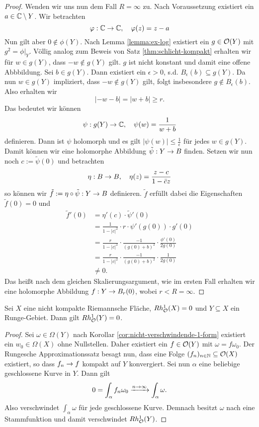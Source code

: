 \begin{proof}
  Wenden wir uns nun dem Fall $R = \infty$ zu. Nach Voraussetzung
  existiert ein $a \in \mathbb{C} \setminus Y$. Wir betrachten
  \[
  \varphi: \mathbb{C} \rightarrow \mathbb{C}, \quad \varphi(z) = z -a
  \]
  Nun gilt aber $0 \notin \phi(Y)$. Nach Lemma \ref{lemma:ex-log}
  existiert ein $g \in \mathcal{O}(Y)$ mit $g^2 = \phi|_Y$. Völlig analog
  zum Beweis von Satz \ref{thm:schlicht-kompakt} erhalten wir für $w
  \in g(Y)$, dass $-w \notin g(Y)$ gilt. $g$ ist nicht konstant und damit
  eine offene Abbbildung. Sei $b \in g(Y)$. Dann existiert ein
  $\epsilon > 0$, s.d. $B_{\epsilon}(b) \subseteq g(Y)$. Da nun  $w
  \in g(Y)$ impliziert, dass $-w \notin g(Y)$ gilt, folgt insbesondere $g \notin
  B_\epsilon(b)$. Also erhalten wir
  \[
  |-w - b| = |w + b| \geq r.
  \]
  Das bedeutet wir können
  \[
  \psi: g(Y) \rightarrow \mathbb{C}, \quad \psi(w) = \frac{1}{w+b}
  \]
  definieren. Dann ist $\psi$ holomorph und es gilt $|\psi(w)| \leq
  \frac{1}{\epsilon}$ für jedes $w \in g(Y)$. 
  Damit können wir eine holomorphe Abbildung $\tilde \psi: Y \rightarrow B$
  finden. Setzen wir nun noch $c:= \tilde \psi(0)$ und betrachten
  \[
  \eta: B \rightarrow B, \quad \eta(z) = \frac{z-c}{1-\bar c z}
  \]
  so können wir $\tilde f := \eta \circ \tilde \psi: Y \rightarrow B$
  definieren. $\tilde f$ erfüllt dabei die Eigenschaften $\tilde f(0)
  = 0$ und
  \begin{align*}
    \tilde f'(0) & = \eta'(c) \cdot \tilde \psi'(0) \\
    & = \frac{1}{1- |c|^2} \cdot r \cdot \psi'(g(0)) \cdot g'(0) \\
    & = \frac{r}{1 - |c|^2} \cdot \frac{-1}{(g(0) + b)^2} \cdot
    \frac{\phi'(0)}{2 g(0)} \\
    & = \frac{r}{1- |c|^2} \cdot \frac{-1}{(g(0) + b)^2} \cdot
    \frac{1}{2 g(0)} \\
    & \neq 0.
  \end{align*}
  Das heißt nach dem gleichen Skalierungsargument, wie im ersten
  Fall erhalten wir eine holomorphe Abbildung $f: Y \rightarrow B_r(0)$, wobei
  $r < R = \infty$.
\end{proof}

\begin{lemma}
  \label{lemma:runge-keine-kohomo}
  Sei $X$ eine nicht kompakte Riemannsche Fläche, $Rh_{\mathcal{O}}^1(X) = 0$ und
  $Y \subseteq X$ ein Runge-Gebiet. Dann gilt $Rh_{\mathcal{O}}^1(Y) = 0$.
\end{lemma}

\begin{proof}
  Sei $\omega \in \Omega(Y)$ nach Korollar
  \ref{cor:nicht-verschwindende-1-form} existiert ein $w_0 \in
  \Omega(X)$ ohne Nullstellen. Daher
  existiert ein $f \in \mathcal{O}(Y)$ mit $\omega = f \omega_0$. 
  Der Rungesche Approximationssatz besagt nun, dass eine Folge $(f_n)_{n
    \in \mathbb{N}} \subseteq \mathcal{O}(X)$ existiert, so dass $f_n \rightarrow f$ kompakt
  auf $Y$ konvergiert.
  Sei nun $\alpha$ eine beliebige geschlossene Kurve in $Y$. 
  Dann gilt
  \[
  0 = \int_\alpha f_n \omega_0 \xrightarrow{n \rightarrow \infty} \int_\alpha
  \omega.
  \]
  Also verschwindet $\int_\alpha \omega$ für jede geschlossene
  Kurve. Demnach besitzt $\omega$ nach \cite[Satz 10.15]{For} eine Stammfunktion und
  damit verschwindet $Rh_{\mathcal{O}}^1(Y)$.
\end{proof}


